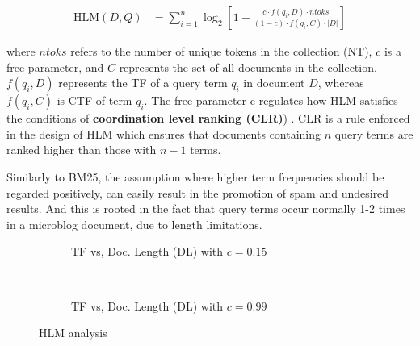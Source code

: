 \begin{small}
\begin{align}
\label{hlmformula}
    \text{HLM}(D,Q) &= \sum_{i=1}^{n} \log_2 \left[ 1 + \frac{c \cdot f(q_i, D) \cdot ntoks }{ (1-c) \cdot f(q_i, C) \cdot |D|} \right]
\end{align}
\end{small}

where $ntoks$ refers to the number of unique tokens in the collection (NT), $c$ is a free parameter, and $C$ represents the set of all documents in the collection. $f(q_i, D)$ represents the TF of a query term $q_i$ in document $D$, whereas $f(q_i, C)$ is CTF of term $q_i$. The free parameter c regulates how HLM satisfies the conditions of \textbf{coordination level ranking (CLR)}) \cite{hiemstra2000relating}. CLR is a rule enforced in the design of HLM which ensures that documents containing $n$ query terms are ranked higher than those with $n-1$ terms.

Similarly to BM25, the assumption where higher term frequencies should be regarded positively, can easily result in the promotion of spam and undesired results. And this is rooted in the fact that query terms occur normally 1-2 times in a microblog document, due to length limitations.

%         

%	

\begin{figure}[]
     \begin{subfigure}[b]{0.5\textwidth}
      \centering
      \caption{TF vs, Doc. Length (DL)  with $c = 0.15$}
       
       	\label{cTFVSDL15}
    \end{subfigure}  
      ~
     \begin{subfigure}[b]{0.5\textwidth}
      \centering
      \caption{TF vs, Doc. Length (DL)  with $c = 0.99$}
       
       \label{cTFVSDL99}
    \end{subfigure}  
    \caption{HLM analysis}
	\label{cTFVSDL}
\end{figure}

